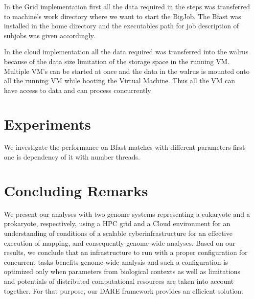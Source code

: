 \documentclass[12pt]{article}
\begin{document}
In the Grid implementation first all the data required in the steps was transferred to machine's  work 
directory where we want to start the BigJob. The Bfast was installed in the home directory and the
executables path for job description of subjobs was given accordingly.

In the cloud implementation all the data required was transferred into the walrus because of the data size limitation of the storage space in the
running VM. Multiple VM's can be started at once and the data in the walrus is mounted onto all the running VM
while booting the Virtual Machine. Thus all the VM can have access to data and can process concurrently

\section{Experiments}

We investigate the performance on Bfast matches with different parameters first one is dependency of it with number threads. 


\section{Concluding Remarks}
We present our analyses with two genome systems representing a eukaryote and a prokaryote, respectively, using
 a HPC grid and a Cloud environment for an understanding of conditions of a scalable cyberinfrastructure for an effective execution of
 mapping, and consequently genome-wide analyses.   Based on our results, we conclude that an infrastructure to run with a proper configuration for concurrent tasks benefits genome-wide analysis and such a configuration is optimized only when parameters from biological contexts as well as limitations and potentials of distributed computational resources are taken into account together.  For that purpose, our DARE framework provides an efficient solution.  





\end{document}
